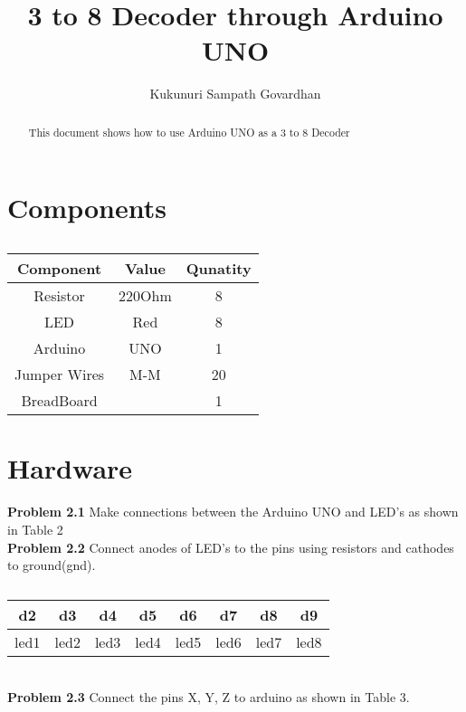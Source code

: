 \documentclass[journal,12pt,twocolumn]{IEEEtran}
\title{
3 to 8 Decoder through Arduino UNO
}
\author{Kukunuri Sampath Govardhan}
\begin{document}
\maketitle
\tableofcontents
\begin{abstract}
This document shows how to use Arduino UNO as a 3 to 8 Decoder
\end{abstract}
\section{Components}
\begin{table}[h]
    \centering
    \begin{tabular}{| c | c | c |}
       \hline
       \textbf{Component}  &  \textbf{Value}  &  \textbf{Qunatity}\\
       \hline
         Resistor  &  220Ohm  &  8  \\
         \hline
         LED  &  Red  &  8  \\
         \hline
         Arduino  & UNO & 1  \\
         \hline
         Jumper Wires  &  M-M  &  20  \\
         \hline
         BreadBoard  &    &  1\\
         \hline
         
    \end{tabular}
    \caption{}
    \label{tab:my_label}
\end{table}
\section{Hardware}
\textbf{Problem 2.1} Make connections between the Arduino UNO and LED's as shown in Table 2 \\

\textbf{Problem 2.2} Connect anodes of LED's to the pins using resistors and cathodes to ground(gnd).\\
\begin{table}[h]
    \centering
    \begin{tabular}{| c | c | c | c | c | c | c | c |}
        \hline
         d2 & d3 & d4 & d5 & d6 & d7 & d8 & d9   \\
       \hline
       led1 & led2 & led3 & led4 & led5 & led6 & led7 & led8  \\
         \hline
    \end{tabular}
    \caption{}
    \label{tab:my_label}
\end{table}
\\
\textbf{Problem 2.3} Connect the pins X, Y, Z to arduino as shown in Table 3.\\
\end{document}
